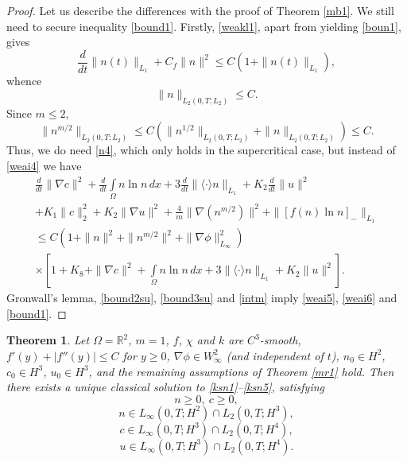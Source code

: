 \documentclass[10pt]{amsart}
\newtheorem {theorem} {Theorem} [section]
\begin{document}
\begin{proof} Let us describe the differences with the proof of Theorem \ref{mb1}. We still need to secure inequality \eqref{bound1}. Firstly, \eqref{weakl1}, apart from yielding \eqref{boun1}, gives \begin{equation}\label{boun1su}\frac d {dt} \|n(t)\|_{L_{1}} +C_f \|n\|^2  \leq C(1+ \|n(t)\|_{L_{1}}), \end{equation} whence 
\begin{equation} \label{bound2su} \|n\|_{L_{2}(0, T; L_{2})} \leq C. \end{equation}
Since $m\leq 2$, \begin{equation} \label{bound3su} \|n^{m/2}\|_{L_{2}(0, T; L_{2})} \leq C(\|n^{1/2}\|_{L_{2}(0, T; L_{2})}+\|n\|_{L_{2}(0, T; L_{2})})\leq C. \end{equation}
Thus, we do need \eqref{n4}, which only holds in the supercritical case, but instead of \eqref{weai4} we have
\begin{multline}\label{weai4su}
\frac {d}{dt} \|\nabla c\|^2 + \frac {d}{dt} \int\limits_{\Omega} n\ln n \, dx+3\frac {d}{dt} \|\langle\cdot\rangle n\|_{L_1}+ K_2\frac {d}{dt} \|u\|^2 \\ +K_1 \|c\|^2_2 + K_2 \|\nabla u\|^2+ \frac 4 m \|\nabla(n^{m/2})\|^2 + \|[f(n)\ln n]_-\|_{L_1} \\ \leq C(1+\|n\|^2+\|n^{m/2}\|^2+ \|\nabla\phi \|^2_{L_\infty}) \\ \times\left[1+ K_8+\|\nabla c\|^2+ \int\limits_{\Omega} n\ln n \, dx+ 3\| \langle\cdot\rangle n\|_{L_{1}}+K_2\|u\|^2\right].
\end{multline}
Gronwall's lemma, \eqref{bound2su}, \eqref{bound3su} and \eqref{intm} imply \eqref{weai5}, \eqref{weai6} and  \eqref{bound1}. 
\end{proof}

\begin{theorem} Let $\Omega={\mathbb{R}}^2$, $m=1$, $f$, $\chi$ and $k$ are $C^3$-smooth, $f'(y)+|f''(y)|\leq C$ for $y\geq 0$, $\nabla \phi \in W^2_\infty$ (and independent of $t$), $n_0\in H^2$, $c_0\in H^3$, $u_0\in H^3$, and the remaining assumptions of Theorem \ref{mr1} hold. Then there exists a unique classical solution to \eqref{ksn1}--\eqref{ksn5}, satisfying  $$n\geq 0,\ c\geq 0,$$ 
\begin{equation} \label{r1}
n \in L_{\infty}(0, T; H^2)\cap L_{2}(0, T; H^3), 
\end{equation}
\begin{equation} \label{r2}
c \in L_{\infty}(0, T; H^3)\cap L_{2}(0, T; H^4),
\end{equation}
\begin{equation} \label{r3}
u \in L_{\infty}(0, T; H^3)\cap L_{2}(0, T; H^4).
\end{equation}
\end{theorem}
\end{document}

